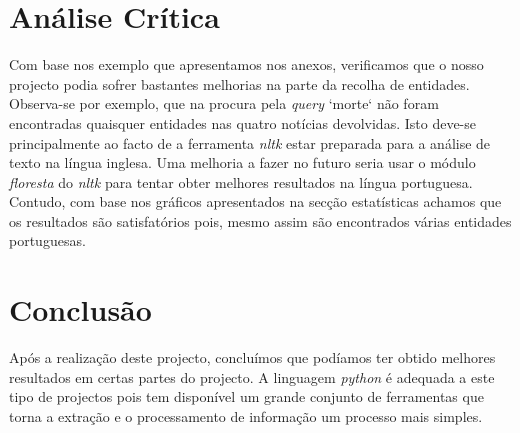 \section{Análise Crítica}
Com base nos exemplo que apresentamos nos anexos, verificamos que o nosso projecto podia sofrer bastantes melhorias na parte da recolha de entidades. Observa-se por exemplo, que na procura pela \textit{query} `morte` não foram encontradas quaisquer entidades nas quatro notícias devolvidas. Isto deve-se principalmente ao facto de a ferramenta \textit{nltk} estar preparada para a análise de texto na língua inglesa. Uma melhoria a fazer no futuro seria usar o módulo \textit{floresta} do \textit{nltk} para tentar obter melhores resultados na língua portuguesa. Contudo, com base nos gráficos apresentados na secção estatísticas achamos que os resultados são satisfatórios pois, mesmo assim são encontrados várias entidades portuguesas.

\section{Conclusão}
Após a realização deste projecto, concluímos que podíamos ter obtido melhores resultados em certas partes do projecto. A linguagem \textit{python} é adequada a este tipo de projectos pois tem disponível um grande conjunto de ferramentas que torna a extração e o processamento de informação um processo mais simples.